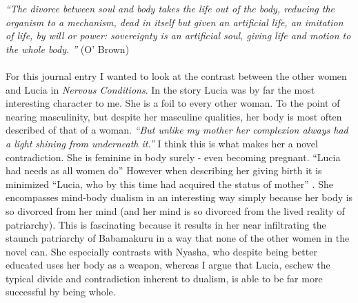 

\maketitle
\textit{``The divorce between soul and body takes the life out of the body, reducing the organism to a mechanism, dead in itself but given an artificial life, an imitation of life, by will or power: sovereignty is an artificial soul, giving life and motion to the whole body. ''} (O' Brown)
\paragraph{}

For this journal entry I wanted to look at the contrast between the other women and Lucia in \textit{Nervous Conditions}. In the story Lucia was by far the most interesting character to me. She is a foil to every other woman. To the point of nearing masculinity, but despite her masculine qualities, her body is most often described of that of a woman. \textit{``But unlike my mother her complexion always had a light shining from underneath it.'' } I think this is what makes her a novel contradiction. She is feminine in body surely - even becoming pregnant. ``Lucia had needs as all women do'' However when describing her giving birth it is minimized ``Lucia, who by this time had acquired the status of mother'' .  She encompasses mind-body dualism in an interesting way simply because her body is so divorced from her mind (and her mind is so divorced from the lived reality of patriarchy). This is fascinating because it results in her near infiltrating the staunch patriarchy of Babamakuru in a way that none of the other women in the novel can. She especially contrasts with Nyasha, who despite being better educated uses her body as a weapon, whereas I argue that Lucia, eschew the typical divide and contradiction inherent to dualism, is able to be far more successful by being whole.






